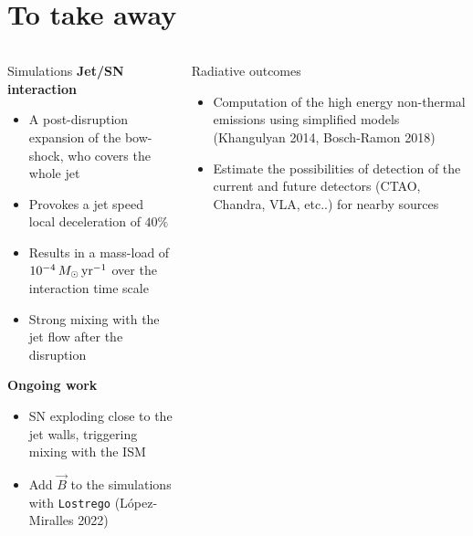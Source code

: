\section{To take away}
\begin{frame}
	\begin{columns}
		{\scriptsize
		\begin{column}{0.5\textwidth}
			\begin{block}{Simulations}
					\textbf{Jet/SN interaction}
				\begin{itemize}
					\item A post-disruption expansion of the bow-shock, who covers the whole jet
					\item Provokes a jet speed local deceleration of $40\%$
					\item Results in a mass-load of $10^{-4}\,M_{\odot}\,{\rm yr}^{-1}$
					      over the interaction time scale 
					\item Strong mixing with the jet flow after the disruption
				\end{itemize}

		\textbf{Ongoing work} 
			\begin{itemize}
				\item SN exploding close to the jet walls, triggering mixing with the ISM
				\item Add $\vec{B}$ to the simulations with \texttt{Lostrego} (L\'opez-Miralles 2022)
			\end{itemize}
			\end{block}


		\end{column}
			\hspace{-.5cm}
		\begin{column}{0.6\textwidth}
			\begin{exampleblock}{Radiative outcomes}
				\begin{itemize}
					\item Computation of the high energy 
							non-thermal emissions using simplified models\\ (Khangulyan 2014, Bosch-Ramon 2018)
					\item Estimate the possibilities of detection of the 
							current and future detectors (CTAO, Chandra, VLA, etc..) for nearby sources
				\end{itemize}
			\end{exampleblock}


\end{column}}
\end{columns}
\end{frame}
